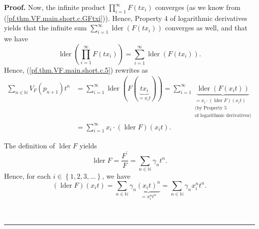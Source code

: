\documentclass[numbers=enddot,12pt,final,onecolumn,notitlepage]{scrartcl}%
\theoremstyle{definition}
\newenvironment{proof}[1][Proof]{\noindent\textbf{#1.} }{\ \rule{0.5em}{0.5em}}
\let\sumnonlimits\sum
\let\prodnonlimits\prod
\renewcommand{\sum}{\sumnonlimits\limits}
\renewcommand{\prod}{\prodnonlimits\limits}
\newenvironment{vershort}{}{}
\begin{document}
\begin{vershort}
\begin{proof}
Now, the infinite product $\prod_{i=1}^{\infty}F\left(  tx_{i}\right)  $
converges (as we know from (\ref{pf.thm.VF.main.short.c.GFtxi})). Hence,
Property 4 of logarithmic derivatives yields that the infinite sum $\sum
_{i=1}^{\infty}\operatorname*{lder}\left(  F\left(  tx_{i}\right)  \right)  $
converges as well, and that we have%
\[
\operatorname*{lder}\left(  \prod_{i=1}^{\infty}F\left(  tx_{i}\right)
\right)  =\sum_{i=1}^{\infty}\operatorname*{lder}\left(  F\left(
tx_{i}\right)  \right)  .
\]
Hence, (\ref{pf.thm.VF.main.short.c.5}) rewrites as%
\begin{align}
\sum_{n\in\mathbb{N}}V_{F}\left(  p_{n+1}\right)  t^{n}  &  =\sum
_{i=1}^{\infty}\operatorname*{lder}\left(  F\left(  \underbrace{tx_{i}%
}_{=x_{i}t}\right)  \right)  =\sum_{i=1}^{\infty}%
\underbrace{\operatorname*{lder}\left(  F\left(  x_{i}t\right)  \right)
}_{\substack{=x_{i}\cdot\left(  \operatorname*{lder}F\right)  \left(
x_{i}t\right)  \\\text{(by Property 5}\\\text{of logarithmic derivatives)}%
}}\nonumber\\
&  =\sum_{i=1}^{\infty}x_{i}\cdot\left(  \operatorname*{lder}F\right)  \left(
x_{i}t\right)  . \label{pf.thm.VF.main.short.c.7}%
\end{align}


The definition of $\operatorname*{lder}F$ yields%
\[
\operatorname*{lder}F=\dfrac{F^{\prime}}{F}=\sum_{n\in\mathbb{N}}\gamma
_{n}t^{n}.
\]
Hence, for each $i\in\left\{  1,2,3,\ldots\right\}  $, we have%
\begin{equation}
\left(  \operatorname*{lder}F\right)  \left(  x_{i}t\right)  =\sum
_{n\in\mathbb{N}}\gamma_{n}\underbrace{\left(  x_{i}t\right)  ^{n}}%
_{=x_{i}^{n}t^{n}}=\sum_{n\in\mathbb{N}}\gamma_{n}x_{i}^{n}t^{n}.
\label{pf.thm.VF.main.short.c.8}%
\end{equation}



\end{proof}
\end{vershort}
\end{document}
